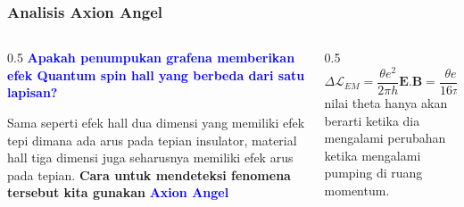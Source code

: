 \documentclass[13pt, aspectratio=169]{beamer}
\begin{document}
\begin{frame}
  \frametitle{Analisis Axion Angel}
  \begin{columns}
    \begin{column}{0.5\textwidth}
      \textcolor{blue}{\textbf{Apakah penumpukan grafena memberikan efek Quantum spin hall yang berbeda dari satu lapisan?}}
      \pause 
      \begin{center}
      \end{center}
      Sama seperti efek hall dua dimensi yang memiliki efek tepi dimana ada arus pada tepian insulator, material hall tiga dimensi juga seharusnya memiliki efek arus pada tepian. \textbf{Cara untuk mendeteksi fenomena tersebut kita gunakan} \textcolor{blue}{\textbf{Axion Angel}}
    \end{column}
    \pause 
    \begin{column}{0.5\textwidth}
     \[
      \boxed{
\Delta \mathcal{L}_{EM} = \frac{\theta e^2}{2 \pi h}\mathbf{E. B} = \frac{\theta e^2}{16 \pi h} \epsilon^{\alpha \beta \gamma \delta}F_{\alpha \beta } F_{\gamma \delta}
}
     \]
     \vspace{2pt}
     \pause
     nilai theta hanya akan berarti ketika dia mengalami perubahan ketika mengalami pumping di ruang momentum.
    \end{column}
  \end{columns}
\end{frame}
\end{document}
